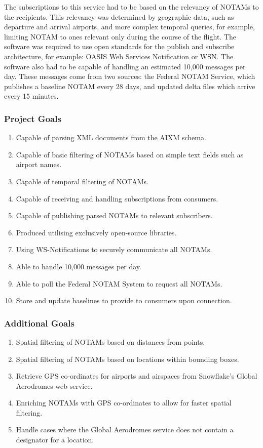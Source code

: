 \documentclass[a4paper, 12pt, twoside]{article}
\begin{document}
The subscriptions to this service had to be based on the relevancy of NOTAMs to the recipients. This relevancy was determined by geographic data, such as departure and arrival airports, and more complex temporal queries, for example, limiting NOTAM to ones relevant only during the course of the flight. The software was required to use open standards for the publish and subscribe architecture, for example: OASIS Web Services Notification or WSN. The software also had to be capable of handling an estimated 10,000 messages per day. These messages come from two sources: the Federal NOTAM Service, which publishes a baseline NOTAM every 28 days, and updated delta files which arrive every 15 minutes.

\subsubsection{Project Goals}
\begin{enumerate}
\item Capable of parsing XML documents from the AIXM schema.
\item Capable of basic filtering of NOTAMs based on simple text fields such as airport names.
\item Capable of temporal filtering of NOTAMs.
\item Capable of receiving and handling subscriptions from consumers.
\item Capable of publishing parsed NOTAMs to relevant subscribers.
\item Produced utilising exclusively open-source libraries.
\item Using WS-Notifications to securely communicate all NOTAMs.
\item Able to handle 10,000 messages per day.
\item Able to poll the Federal NOTAM System to request all NOTAMs.
\item Store and update baselines to provide to consumers upon connection.
\end{enumerate}

\subsubsection{Additional Goals}
\begin{enumerate}
\item Spatial filtering of NOTAMs based on distances from points.
\item Spatial filtering of NOTAMs based on locations within bounding boxes.
\item Retrieve GPS co-ordinates for airports and airspaces from Snowflake's Global Aerodromes web service.
\item Enriching NOTAMs with GPS co-ordinates to allow for faster spatial filtering.
\item Handle cases where the Global Aerodromes service does not contain a designator for a location.
\end{enumerate}
\end{document}
